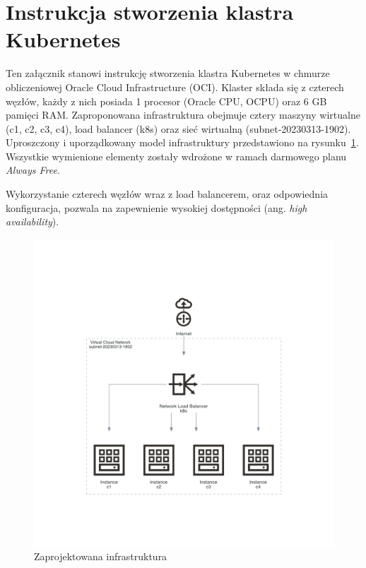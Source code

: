 \newpage

\section{Instrukcja stworzenia klastra Kubernetes}

Ten załącznik stanowi instrukcję stworzenia klastra Kubernetes w chmurze obliczeniowej Oracle Cloud Infrastructure (OCI).
Klaster składa się z czterech węzłów, każdy z nich posiada 1 procesor (Oracle CPU, OCPU) oraz 6 GB pamięci RAM\@.
Zaproponowana infrastruktura obejmuje cztery maszyny wirtualne (c1, c2, c3, c4), load balancer (k8s) oraz sieć wirtualną (subnet-20230313-1902).
Uproszczony i uporządkowany model infrastruktury przedstawiono na rysunku~\ref{fig:infrastructure}.
Wszystkie wymienione elementy zostały wdrożone w ramach darmowego planu \emph{Always Free}.

Wykorzystanie czterech węzłów wraz z load balancerem, oraz odpowiednia konfiguracja, pozwala na zapewnienie wysokiej dostępności (ang. \emph{high availability}).

\begin{figure}[H]
    \centering
    \includegraphics[width=\textwidth]{img/oci-infrastructure}
    \caption{Zaprojektowana infrastruktura}
    \label{fig:infrastructure}
\end{figure}

